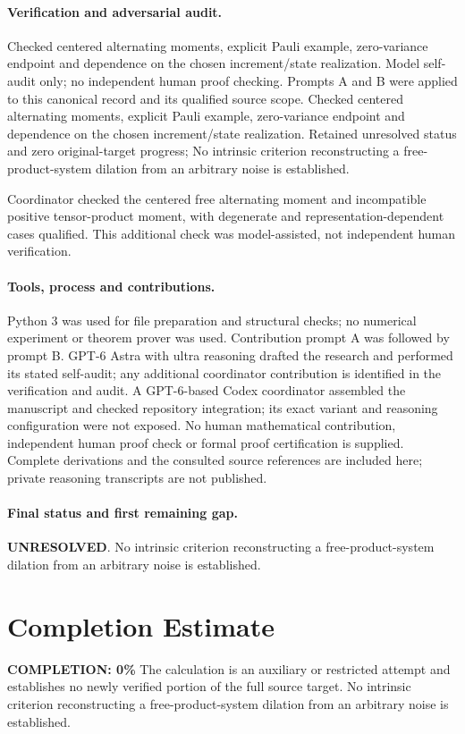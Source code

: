\documentclass[11pt]{article}
\begin{document}
\paragraph{Verification and adversarial audit.}
Checked centered alternating moments, explicit Pauli example, zero-variance endpoint and dependence on the chosen increment/state realization. Model self-audit only; no independent human proof checking. Prompts A and B were applied to this canonical record and its qualified source scope. Checked centered alternating moments, explicit Pauli example, zero-variance endpoint and dependence on the chosen increment/state realization. Retained unresolved status and zero original-target progress; No intrinsic criterion reconstructing a free-product-system dilation from an arbitrary noise is established.

Coordinator checked the centered free alternating moment and incompatible positive tensor-product moment, with degenerate and representation-dependent cases qualified. This additional check was model-assisted, not independent human verification.

\paragraph{Tools, process and contributions.}
Python 3 was used for file preparation and structural checks; no numerical experiment or theorem prover was used. Contribution prompt A was followed by prompt B. GPT-6 Astra with ultra reasoning drafted the research and performed its stated self-audit; any additional coordinator contribution is identified in the verification and audit. A GPT-6-based Codex coordinator assembled the manuscript and checked repository integration; its exact variant and reasoning configuration were not exposed. No human mathematical contribution, independent human proof check or formal proof certification is supplied. Complete derivations and the consulted source references are included here; private reasoning transcripts are not published.

\paragraph{Final status and first remaining gap.}
\textbf{UNRESOLVED}. No intrinsic criterion reconstructing a free-product-system dilation from an arbitrary noise is established.

\section{Completion Estimate}
\noindent\textbf{COMPLETION: 0\%}
The calculation is an auxiliary or restricted attempt and establishes no newly verified portion of the full source target. No intrinsic criterion reconstructing a free-product-system dilation from an arbitrary noise is established.
\end{document}
